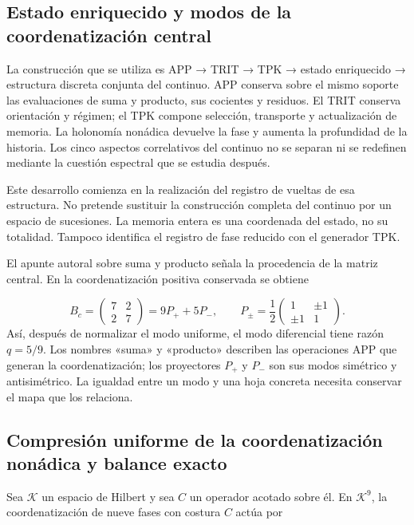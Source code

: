 \subsection{Estado enriquecido y modos de la coordenatización central}
\label{tm-add-c1}
La construcción que se utiliza es APP → TRIT → TPK → estado enriquecido → estructura discreta conjunta del continuo. APP conserva sobre el mismo soporte las evaluaciones de suma y producto, sus cocientes y residuos. El TRIT conserva orientación y régimen; el TPK compone selección, transporte y actualización de memoria. La holonomía nonádica devuelve la fase y aumenta la profundidad de la historia. Los cinco aspectos correlativos del continuo no se separan ni se redefinen mediante la cuestión espectral que se estudia después.

Este desarrollo comienza en la realización del registro de vueltas de esa estructura. No pretende sustituir la construcción completa del continuo por un espacio de sucesiones. La memoria entera es una coordenada del estado, no su totalidad. Tampoco identifica el registro de fase reducido con el generador TPK.

El apunte autoral sobre suma y producto señala la procedencia de la matriz central. En la coordenatización positiva conservada se obtiene

\[
B_c=\begin{pmatrix}7&2\\2&7\end{pmatrix}
=9P_++5P_-,\qquad
P_\pm=\frac12\begin{pmatrix}1&\pm1\\\pm1&1\end{pmatrix}.
\]
Así, después de normalizar el modo uniforme, el modo diferencial tiene razón \(q=5/9\). Los nombres «suma» y «producto» describen las operaciones APP que generan la coordenatización; los proyectores \(P_+\) y \(P_-\) son sus modos simétrico y antisimétrico. La igualdad entre un modo y una hoja concreta necesita conservar el mapa que los relaciona.


\subsection{Compresión uniforme de la coordenatización nonádica y balance exacto}
\label{tm-add-c2}
Sea \(\mathcal K\) un espacio de Hilbert y sea \(C\) un operador acotado sobre él. En \(\mathcal K^9\), la coordenatización de nueve fases con costura \(C\) actúa por

